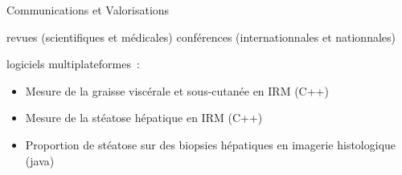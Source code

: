 

\begin{rubric}{Communications et Valorisations}
  
   revues (scientifiques et médicales)
   conférences (internationnales et nationnales)
  
   logiciels multiplateformes~: 
  \begin{itemize}
  \item Mesure de la graisse viscérale et sous-cutanée en IRM (C++)
  \item Mesure de la stéatose hépatique en IRM (C++)
  \item Proportion de stéatose sur des biopsies hépatiques en imagerie
    histologique (java)
  \end{itemize}
  
  

  
  
  


\end{rubric}
